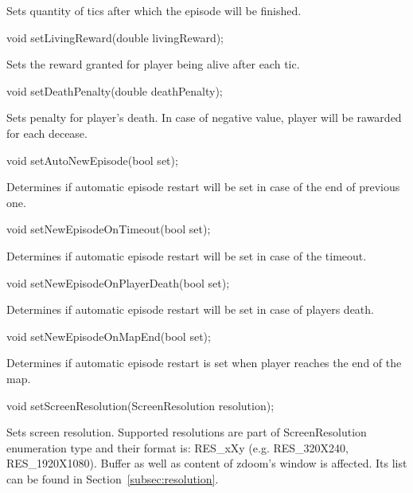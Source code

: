 Sets quantity of tics after which the episode will be finished.


\vspace{20pt}
\begin{clinee}
void setLivingReward(double livingReward);
\end{clinee}

Sets the reward granted for player being alive after each tic.


\vspace{20pt}
\begin{clinee}
void setDeathPenalty(double deathPenalty);
\end{clinee}

Sets penalty for player's death. In case of negative value, player will be rawarded for each decease.


\vspace{20pt}
\begin{clinee}
void setAutoNewEpisode(bool set);
\end{clinee}

Determines if automatic episode restart will be set in case of the end of previous one.


\vspace{20pt}
\begin{clinee}
void setNewEpisodeOnTimeout(bool set);
\end{clinee}

Determines if automatic episode restart will be set in case of the timeout.


\vspace{20pt}
\begin{clinee}
void setNewEpisodeOnPlayerDeath(bool set);
\end{clinee}

Determines if automatic episode restart will be set in case of players death.


\vspace{20pt}
\begin{clinee}
void setNewEpisodeOnMapEnd(bool set);
\end{clinee}

Determines if automatic episode restart is set when player reaches the end of the map.


\vspace{20pt}
\begin{clinee}
void setScreenResolution(ScreenResolution resolution);
\end{clinee}

Sets screen resolution. Supported resolutions are part of ScreenResolution enumeration type and their format is: RES\_xXy (e.g. RES\_320X240, RES\_1920X1080). Buffer as well as content of zdoom's window is affected. Its list can be found in Section~\ref{subsec:resolution}.


